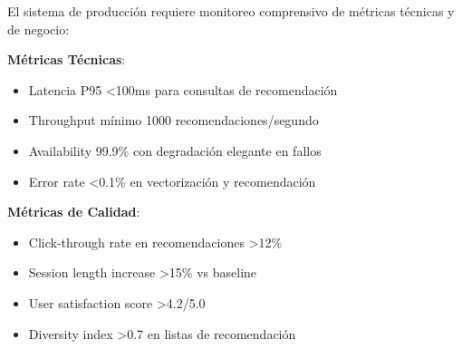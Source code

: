 \documentclass[12pt,a4paper]{report}
\begin{document}
El sistema de producción requiere monitoreo comprensivo de métricas técnicas y de negocio:

\textbf{Métricas Técnicas}:
\begin{itemize}
\item Latencia P95 <100ms para consultas de recomendación
\item Throughput mínimo 1000 recomendaciones/segundo
\item Availability 99.9\% con degradación elegante en fallos
\item Error rate <0.1\% en vectorización y recomendación
\end{itemize}

\textbf{Métricas de Calidad}:
\begin{itemize}
\item Click-through rate en recomendaciones >12\%
\item Session length increase >15\% vs baseline
\item User satisfaction score >4.2/5.0
\item Diversity index >0.7 en listas de recomendación
\end{itemize}
\end{document}
